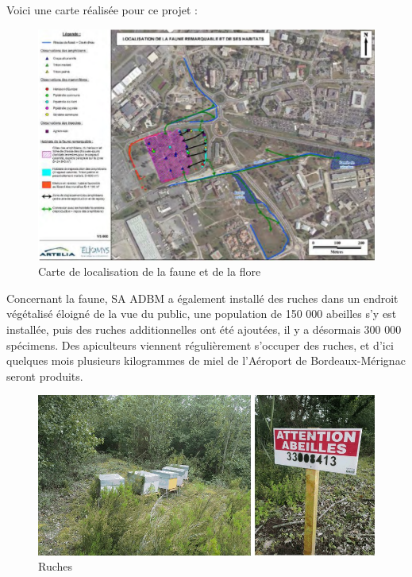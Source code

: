 Voici une carte réalisée pour ce projet :

\begin{figure}[hbt!]
  \centering
  \includegraphics[width=14cm]{Images/carteenvironnement.png}
  \caption{Carte de localisation de la faune et de la flore}
  \label{fig:crapeau}
\end{figure}

Concernant la faune, SA ADBM a également installé des ruches dans un endroit végétalisé éloigné de la vue du public, une population de 150 000 abeilles s'y est installée, puis des ruches additionnelles ont été ajoutées, il y a désormais 300 000 spécimens. Des apiculteurs viennent régulièrement s'occuper des ruches, et d'ici quelques mois plusieurs kilogrammes de miel de l'Aéroport de Bordeaux-Mérignac seront produits.

 \begin{figure}[hbt!]
   \centering
   \includegraphics[width=14cm]{Images/ruches.jpg}
   \caption{Ruches}
   \label{fig:abeilles}
 \end{figure}

